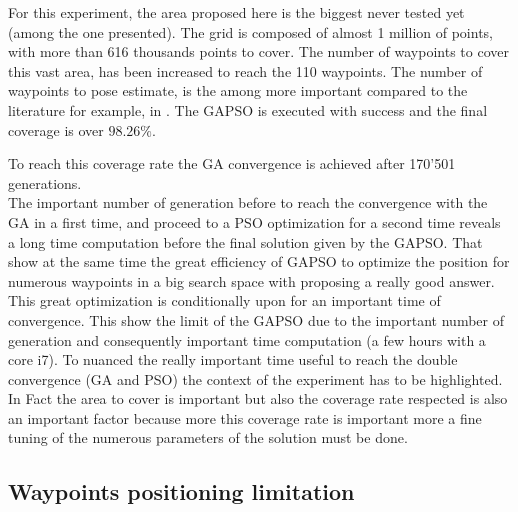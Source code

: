 For this experiment, the area proposed here is the biggest never tested yet (among the one presented). The grid is composed of almost 1 million of points, with more than 616 thousands points to cover. The number of waypoints to cover this vast area, has been increased to reach the 110 waypoints. 
The number of waypoints to pose estimate, is the among more important compared to the literature for example, in \citep{8*zhou2011,33*reddy2012,82*chrysostomou2012,143*maji2015, 151*zhao2013, 152*wang2009, 165*jiang2010, 193*fu2014, 181*wang2017, 18*ding2012}. %
The GAPSO is executed with success and the final coverage is over $98.26\%$.  
	
	 To reach this coverage rate the GA convergence is achieved after 170'501 generations. \\
	 The important number of generation before to reach the convergence with the GA in a first time, and  proceed to a PSO optimization for a second time reveals a long time computation before the final solution given by the GAPSO. 
	 That show at the same time the great efficiency of GAPSO to optimize the position for numerous waypoints in a big search space with proposing a really good answer. This great optimization is conditionally upon for an important time of convergence. This show the limit of the GAPSO due to the important number of generation and consequently important time computation (a few hours with a core i7).  
	 To nuanced the really important time useful to reach the double convergence (GA and PSO) the context of the experiment has to be highlighted. In Fact the area to cover is important but also the coverage rate respected is also an important factor because more this coverage rate is important more a fine tuning of the numerous parameters of the solution must be done.
	
	\subsection{Waypoints positioning limitation} 
	
